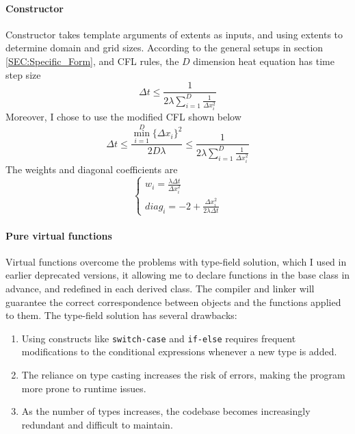 \paragraph{Constructor} 
Constructor takes template arguments of extents as inputs, and using extents to determine domain and grid sizes.
According to the general setups in section \ref{SEC:Specific_Form}, and CFL rules, the $D$ dimension heat equation has time step size
\begin{equation}
  \Delta t \leqslant \frac{1}{ 
    \displaystyle 
    2 \lambda 
    \sum_{i=1}^{D} \frac{1}{\Delta x_i ^2}
  }
\end{equation}
Moreover, I chose to use the modified 
                                          CFL \cite{CFL} 
shown below 
\begin{equation}
  \Delta t 
  \leqslant 
  \frac{ \min_{i=1}^{D} \{\Delta x_i\}^2}{2 D\lambda}
  \leqslant 
  \frac{1}{ 
    \displaystyle 
    2 \lambda 
    \sum_{i=1}^{D} \frac{1}{\Delta x_i ^2}
  }
\end{equation}
The weights and diagonal coefficients are 
\begin{equation}
  \begin{cases}
    \displaystyle w_i = \frac{\lambda \Delta t}{\Delta x_i^2}               \\
    \displaystyle diag_i = -2 + \frac{\Delta x_i^2}{2\lambda\Delta t}
  \end{cases}
\end{equation}

\paragraph{Pure virtual functions }
Virtual functions overcome the problems with type-field solution, which I used in earlier deprecated versions, 
it allowing me to declare functions in the base class in advance, and redefined in each derived class.
The compiler and linker will guarantee the correct correspondence between objects and the functions applied to them.
The type-field solution has several drawbacks:
\begin{enumerate}
  \item Using constructs like \texttt{switch-case} and \texttt{if-else} requires frequent modifications to the conditional expressions whenever a new type is added.
  \item The reliance on type casting increases the risk of errors, making the program more prone to runtime issues.
  \item As the number of types increases, the codebase becomes increasingly redundant and difficult to maintain.
\end{enumerate}

